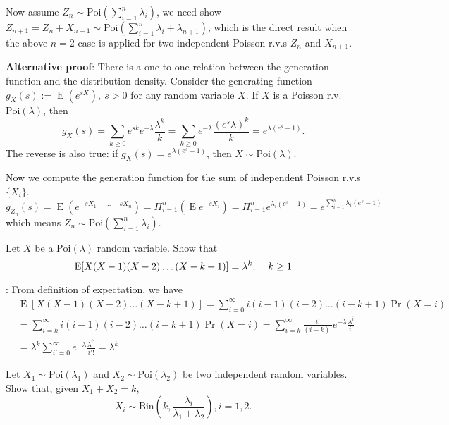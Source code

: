\documentclass[  11pt]{article}
\newcommand{\p}{ {\Pr}}
\newcommand{\Poi}{\mbox{Poi}}
\newcommand{\Bin}{\mbox{Bin}}
\newcommand{\e}{ \operatorname{E}}
\begin{document}
\begin{ExerciseList}
 Now assume $Z_n \sim \Poi(\sum_{i=1}^n\lambda_i)$, we need show
 $Z_{n+1}=Z_n + X_{n+1}  \sim \Poi(\sum_{i=1}^n\lambda_i + \lambda_{n+1})$,
 which is the direct result when the above $n=2$ case is applied
 for two independent  Poisson r.v.s $Z_n$ and $X_{n+1}$.



\medskip

\textbf{Alternative proof}:
There is a one-to-one relation between the   generation function
and the distribution density. 
 Consider the generating function 
$g_X(s) := \e(e^{s X}),~ s>0$   for any random variable $X$.
If   $X$ is a Poisson r.v. $\Poi(\lambda)$, then 
\[ g_X(s)= \sum_{k\geq 0} e^{sk}  e^{-\lambda} \frac{\lambda^k}{k\!}
= \sum_{k\geq 0}   e^{-\lambda} \frac{(e^s \lambda)^k}{k\!}=e^{\lambda (e^s-1)}.\]  The reverse is also true:
if $g_X(s)=e^{\lambda (e^s-1) }$, then $X\sim \Poi(\lambda)$.
 
 
 
Now we compute the generation function for the sum of independent Poisson r.v.s $\{X_i\}$.
\[g_{Z_n}(s)=\e(e^{-s X_1-\ldots - s X_n}) = \Pi_{i=1}^n (\e e^{-sX_i}) =
\Pi_{i=1}^ne^{\lambda_i (e^s-1)}
=e^{\sum_{i=1}^n\lambda_i (e^s-1)}
\]
which means $Z_n\sim \Poi(\sum_{i=1}^n \lambda_i)$.


\Exercise [origin={3.9, p79}] 
  Let $X$ be a $\Poi(\lambda)$ random variable. Show that
$$\e[X(X-1)(X-2)\dots(X-k+1)] = \lambda^k, \hspace{0.4cm} k\ge 1$$
 
\Answer: 
From definition of expectation, we have
\[\begin{split}
&\e[X(X-1)(X-2)\dots(X-k+1)] = \sum_{i=0}^{\infty} i(i-1)(i-2)\dots(i-k+1) \p(X=i) \\
&=\sum_{i=k}^{\infty} i(i-1)(i-2)\dots(i-k+1) \p(X=i)
= \sum_{i=k}^{\infty} \frac{i!}{(i-k)!} e^{-\lambda}\frac{\lambda^i}{i!} \\
&= \lambda^k \sum_{i'=0}^{\infty} e^{-\lambda}\frac{\lambda^{i'}}{i'!}
= \lambda^k
\end{split}\]




\Exercise [origin={3.10, p79}] 
  Let $X_1\sim \Poi(\lambda_1)$ and $X_2 \sim \Poi(\lambda_2)$ be two independent random variables. Show that, given $X_1+X_2 = k$,
  \[ X_i\sim\Bin(k,\frac{\lambda_i}{\lambda_1+\lambda_2}), i = 1,2.\]\\
\Answer


\end{ExerciseList}
\end{document}
